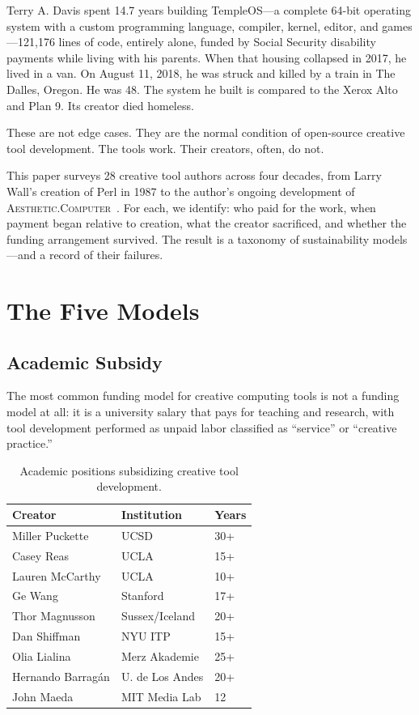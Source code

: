 \documentclass[10pt,letterpaper,twocolumn]{article}
\newcommand{\ac}{\textsc{Aesthetic.Computer}}
\begin{document}
Terry A. Davis spent 14.7 years building TempleOS---a complete 64-bit operating system with a custom programming language, compiler, kernel, editor, and games---121,176 lines of code, entirely alone, funded by Social Security disability payments while living with his parents. When that housing collapsed in 2017, he lived in a van. On August 11, 2018, he was struck and killed by a train in The Dalles, Oregon. He was 48. The system he built is compared to the Xerox Alto and Plan 9. Its creator died homeless.

These are not edge cases. They are the normal condition of open-source creative tool development. The tools work. Their creators, often, do not.

This paper surveys 28 creative tool authors across four decades, from Larry Wall's creation of Perl in 1987 to the author's ongoing development of \ac{}~\citep{scudder2026ac}. For each, we identify: who paid for the work, when payment began relative to creation, what the creator sacrificed, and whether the funding arrangement survived. The result is a taxonomy of sustainability models---and a record of their failures.

\section{The Five Models}

\subsection{Academic Subsidy}

The most common funding model for creative computing tools is not a funding model at all: it is a university salary that pays for teaching and research, with tool development performed as unpaid labor classified as ``service'' or ``creative practice.''

\begin{table}[h]
\small
\centering
\begin{tabularx}{\linewidth}{XXX}
\toprule
\textbf{Creator} & \textbf{Institution} & \textbf{Years} \\
\midrule
Miller Puckette & UCSD & 30+ \\
Casey Reas & UCLA & 15+ \\
Lauren McCarthy & UCLA & 10+ \\
Ge Wang & Stanford & 17+ \\
Thor Magnusson & Sussex/Iceland & 20+ \\
Dan Shiffman & NYU ITP & 15+ \\
Olia Lialina & Merz Akademie & 25+ \\
Hernando Barrag\'an & U. de Los Andes & 20+ \\
John Maeda & MIT Media Lab & 12 \\
\bottomrule
\end{tabularx}
\caption{Academic positions subsidizing creative tool development.}
\label{tab:academic}
\end{table}
\end{document}
